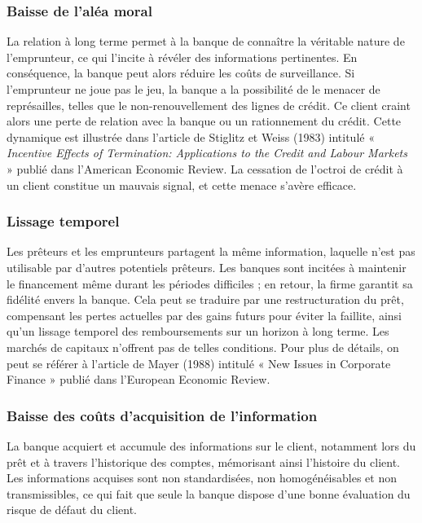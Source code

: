 \documentclass[a4paper, 12pt]{report}
\begin{document}
\subsubsection{Baisse de l’aléa moral}

La relation à long terme permet à la banque de connaître la véritable nature de l'emprunteur, ce qui l'incite à révéler des informations pertinentes. En conséquence, la banque peut alors réduire les coûts de surveillance. Si l'emprunteur ne joue pas le jeu, la banque a la possibilité de le menacer de représailles, telles que le non-renouvellement des lignes de crédit. Ce client craint alors une perte de relation avec la banque ou un rationnement du crédit. Cette dynamique est illustrée dans l'article de Stiglitz et Weiss (1983) intitulé « \textit{Incentive Effects of Termination: Applications to the Credit and Labour Markets} » publié dans l'American Economic Review. La cessation de l'octroi de crédit à un client constitue un mauvais signal, et cette menace s'avère efficace.

\subsubsection{Lissage temporel}

Les prêteurs et les emprunteurs partagent la même information, laquelle n'est pas utilisable par d'autres potentiels prêteurs. Les banques sont incitées à maintenir le financement même durant les périodes difficiles ; en retour, la firme garantit sa fidélité envers la banque. Cela peut se traduire par une restructuration du prêt, compensant les pertes actuelles par des gains futurs pour éviter la faillite, ainsi qu'un lissage temporel des remboursements sur un horizon à long terme. Les marchés de capitaux n'offrent pas de telles conditions. Pour plus de détails, on peut se référer à l'article de Mayer (1988) intitulé « New Issues in Corporate Finance » publié dans l'European Economic Review.


\subsubsection{Baisse des coûts d’acquisition de l’information}

La banque acquiert et accumule des informations sur le client, notamment lors du prêt et à travers l'historique des comptes, mémorisant ainsi l'histoire du client. Les informations acquises sont non standardisées, non homogénéisables et non transmissibles, ce qui fait que seule la banque dispose d'une bonne évaluation du risque de défaut du client. 
\end{document}
